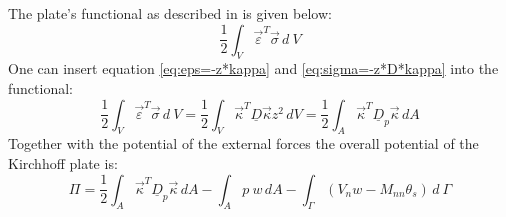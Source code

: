   The plate's functional as described in \cite{steinke2005finite} is given below:
  \begin{equation}
  \frac{1}{2} \int_V \vec{\varepsilon}^T \vec{\sigma}\, d\:\!V
  \end{equation}
  One can insert equation \eqref{eq:eps=-z*kappa} and \eqref{eq:sigma=-z*D*kappa} into the functional:
  \begin{equation}
  \frac{1}{2} \int_V \vec{\varepsilon}^T \vec{\sigma}\, d\:\!V = \frac{1}{2}\int_V \vec{\kappa}^T \underline{D} \vec{\kappa} z^2\, d\!V = \frac{1}{2} \int_A \vec{\kappa}^T \underline{D}_p \vec{\kappa}\, d\!A
  \end{equation}
  Together with the potential of the external forces the overall potential of the Kirchhoff plate is:
  \begin{equation}\label{eq:plateFunctional}
  \Pi = \frac{1}{2}\int_A \vec{\kappa}^T \underline{D}_p \vec{\kappa}\, dA
  - \int_A p\ w\, d\!A
  - \int_{\Gamma}\left(V_n w - M_{nn} \theta_s\right)\,d\:\!\Gamma
  \end{equation}
  
